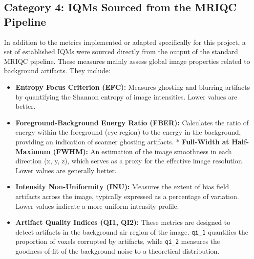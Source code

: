 \subsection{Category 4: IQMs Sourced from the MRIQC Pipeline}
\label{ssec:mriqc_iqms}
In addition to the metrics implemented or adapted specifically for this project, a set of established IQMs were sourced directly from the output of the standard MRIQC pipeline. These measures mainly assess global image properties related to background artifacts. They include:
\begin{itemize}
    \item \textbf{Entropy Focus Criterion (EFC):} Measures ghosting and blurring artifacts by quantifying the Shannon entropy of image intensities. Lower values are better.
    \item \textbf{Foreground-Background Energy Ratio (FBER):} Calculates the ratio of energy within the foreground (eye region) to the energy in the background, providing an indication of scanner ghosting artifacts.
    * \textbf{Full-Width at Half-Maximum (FWHM):} An estimation of the image smoothness in each direction (x, y, z), which serves as a proxy for the effective image resolution. Lower values are generally better.
    \item \textbf{Intensity Non-Uniformity (INU):} Measures the extent of bias field artifacts across the image, typically expressed as a percentage of variation. Lower values indicate a more uniform intensity profile.
    \item \textbf{Artifact Quality Indices (QI1, QI2):} These metrics are designed to detect artifacts in the background air region of the image. \texttt{qi\_1} quantifies the proportion of voxels corrupted by artifacts, while \texttt{qi\_2} measures the goodness-of-fit of the background noise to a theoretical distribution.
\end{itemize}